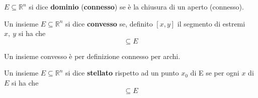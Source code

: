 \begin{definition}
   $E \subseteq \mathbb{R}^n$ si dice \textbf{dominio} (\textbf{connesso}) se è la chiusura di un aperto (connesso).
\end{definition}
\begin{definition}
    Un insieme $E \subseteq \mathbb{R}^n$ si dice \textbf{convesso} se, definito $[x,y]$ il segmento di estremi $x,\ y$ si ha che
    \begin{equation*}
        [x,y] \subseteq E
    \end{equation*}
    \end{definition}
    \begin{oss}
        Un insieme convesso è per definizione connesso per archi.
    \end{oss}
\begin{definition}
    Un insieme $E \subseteq \mathbb{R}^n$ si dice \textbf{stellato} rispetto ad un punto $x_0$ di E se per ogni $x$ di $E$ si ha che
    \begin{equation*}
        [x_0, x] \subseteq E
    \end{equation*}
\end{definition}



